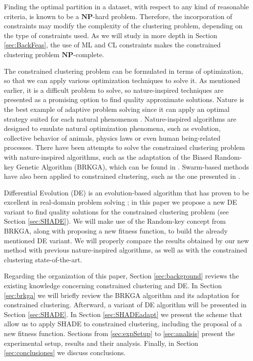 \documentclass[review]{elsarticle}
\begin{document}
Finding the optimal partition in a dataset, with respect to any kind of reasonable criteria, is known to be a $\mathbf{NP}$-hard problem. Therefore, the incorporation of constraints may modify the complexity of the clustering problem, depending on the type of constraints used. As we will study in more depth in Section \ref{sec:BackFeas}, the use of ML and CL constraints makes the constrained clustering problem $\mathbf{NP}$-complete. \cite{davidson2005clustering}

The constrained clustering problem can be formulated in terms of optimization, so that we can apply various optimization techniques to solve it. As mentioned earlier, it is a difficult problem to solve, so nature-inspired techniques are presented as a promising option to find quality approximate solutions. Nature is the best example of adaptive problem solving since it can apply an optimal strategy suited for each natural phenomenon \cite{fausto2019ants}. Nature-inspired algorithms are designed to emulate natural optimization phenomena, such as evolution, collective behavior of animals, physics laws or even human being-related processes. There have been attempts to solve the constrained clustering problem with nature-inspired algorithms, such as the adaptation of the Biased Random-key Genetic Algorithm (BRKGA), which can be found in \cite{de2017comparison}. Swarm-based methods have also been applied to constrained clustering, such as the one presented in \cite{xu2013improving}.

Differential Evolution (DE) is an evolution-based algorithm that has proven to be excellent in real-domain problem solving \cite{das2011differential}; in this paper we propose a new DE variant to find quality solutions for the constrained clustering problem (see Section \ref{sec:SHADE}). We will make use of the Random-key concept from BRKGA, along with proposing a new fitness function, to build the already mentioned DE variant. We will properly compare the results obtained by our new method with previous nature-inspired algorithms, as well as with the constrained clustering state-of-the-art.

Regarding the organization of this paper, Section \ref{sec:background} reviews the existing knowledge concerning constrained clustering and DE. In Section \ref{sec:brkga} we will briefly review the BRKGA algorithm and its adaptation for constrained clustering. Afterward, a variant of DE algorithm will be presented in Section \ref{sec:SHADE}. In Section \ref{sec:SHADEadapt} we present the scheme that allow us to apply SHADE to constrained clustering, including the proposal of a new fitness function. Sections from \ref{sec:expSetup} to \ref{sec:analisis} present the experimental setup, results and their analysis. Finally, in Section \ref{sec:conclusiones} we discuss conclusions.
\end{document}
